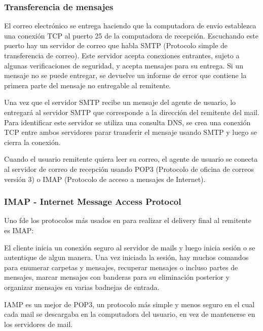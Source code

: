 \subsubsection{Transferencia de mensajes}
El correo electrónico se entrega haciendo que la computadora de envío establezca una conexión TCP al puerto 25 de la computadora de recepción. Escuchando este puerto hay un servidor de correo que habla SMTP (Protocolo simple de transferencia de correo). Este servidor acepta conexiones entrantes, sujeto a algunas verificaciones de seguridad, y acepta mensajes para su entrega. Si un mensaje no se puede entregar, se devuelve un informe de error que contiene la primera parte del mensaje no entregable al remitente.

Una vez que el servidor SMTP recibe un mensaje del agente de usuario, lo entregará al servidor SMTP que corresponde a la dirección del remitente del mail. Para identificar este servidor se utiliza una consulta DNS, se crea una conexión TCP entre ambos servidores parar transferir el mensaje usando SMTP y luego se cierra la conexión.

Cuando el usuario remitente quiera leer su correo, el agente de usuario se conecta al servidor de correo de recepción usando POP3 (Protocolo de oficina de correos versión 3) o IMAP (Protocolo de acceso a mensajes de Internet).

\subsubsection{IMAP - Internet Message Access Protocol}
Uno fde los protocolos más usados en para realizar el delivery final al remitente es IMAP:

El cliente inicia un conexión seguro al servidor de mails y luego inicia sesión o se autentique de algun manera. Una vez iniciada la sesión, hay muchos comandos para enumerar carpetas y mensajes, recuperar mensajes o incluso partes de mensajes, marcar mensajes con banderas para su eliminación posterior y organizar mensajes en varias badnejas de entrada.

IAMP es un mejor de POP3, un protocolo más simple y menos seguro en el cual cada mail se descargaba en la computadora del usuario, en vez de mantenerse en los servidores de mail. 


